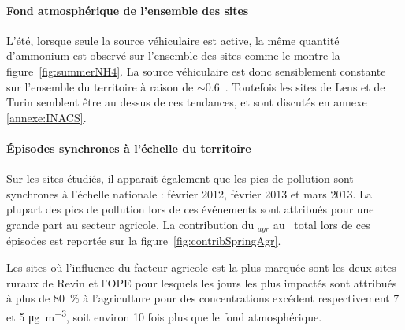 \paragraph{Fond atmosphérique de l'ensemble des sites}
L'été, lorsque seule la source véhiculaire est active, la même quantité d'ammonium est
observé sur l'ensemble des sites comme le montre la figure~\ref{fig:summerNH4}.
La source véhiculaire est donc sensiblement constante sur l'ensemble du territoire à
raison de $\sim0.6$~\si{\ugm}.
Toutefois les sites de Lens et de Turin semblent être au dessus de ces tendances, et sont
discutés en annexe \ref{annexe:INACS}.

\paragraph{Épisodes synchrones à l'échelle du territoire}
Sur les sites étudiés, il apparait également que les pics de pollution sont synchrones à
l'échelle nationale : février 2012, février 2013 et mars 2013.
La plupart des pics de pollution lors de ces événements sont attribués pour une grande
part au secteur agricole.
La contribution du \NHq$_{agr}$ au \NHq~total lors de ces épisodes est reportée sur la
figure~\ref{fig:contribSpringAgr}.

Les sites où l'influence du facteur agricole est la plus marquée sont les deux sites
ruraux de Revin et l'OPE pour lesquels les jours les plus impactés sont attribués à plus
de 80~\% à l'agriculture pour des concentrations excédent respectivement 7 et 5
\si{\micro\g\per\cubic\meter}, soit environ 10 fois plus que le fond atmosphérique.


